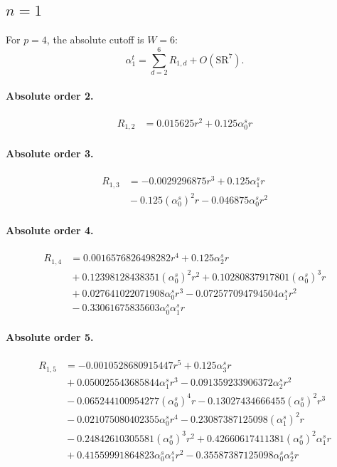 \documentclass[10pt]{article}
\begin{document}
\subsection{$n=1$}
For $p=4$, the absolute cutoff is $W=6$:
\[\alpha_{1}^t=\sum_{d=2}^{6}R_{1,d}+O(\mathrm{SR}^{7}).\]
\paragraph{Absolute order 2.}
\begin{align*}
R_{1,2} &= 0.015625 r^{2} + 0.125 \alpha_{0}^s r
\end{align*}

\paragraph{Absolute order 3.}
\begin{align*}
R_{1,3} &=  - 0.0029296875 r^{3} + 0.125 \alpha_{1}^s r \\
&{}  - 0.125 \left(\alpha_{0}^s\right)^{2} r - 0.046875 \alpha_{0}^s r^{2}
\end{align*}

\paragraph{Absolute order 4.}
\begin{align*}
R_{1,4} &= 0.0016576826498282 r^{4} + 0.125 \alpha_{2}^s r \\
&{}  + 0.12398128438351 \left(\alpha_{0}^s\right)^{2} r^{2} + 0.10280837917801 \left(\alpha_{0}^s\right)^{3} r \\
&{}  + 0.027641022071908 \alpha_{0}^s r^{3} - 0.072577094794504 \alpha_{1}^s r^{2} \\
&{}  - 0.33061675835603 \alpha_{0}^s \alpha_{1}^s r
\end{align*}

\paragraph{Absolute order 5.}
\begin{align*}
R_{1,5} &=  - 0.0010528680915447 r^{5} + 0.125 \alpha_{3}^s r \\
&{}  + 0.050025543685844 \alpha_{1}^s r^{3} - 0.091359233906372 \alpha_{2}^s r^{2} \\
&{}  - 0.065244100954277 \left(\alpha_{0}^s\right)^{4} r - 0.13027434666455 \left(\alpha_{0}^s\right)^{2} r^{3} \\
&{}  - 0.021075080402355 \alpha_{0}^s r^{4} - 0.23087387125098 \left(\alpha_{1}^s\right)^{2} r \\
&{}  - 0.24842610305581 \left(\alpha_{0}^s\right)^{3} r^{2} + 0.42660617411381 \left(\alpha_{0}^s\right)^{2} \alpha_{1}^s r \\
&{}  + 0.41559991864823 \alpha_{0}^s \alpha_{1}^s r^{2} - 0.35587387125098 \alpha_{0}^s \alpha_{2}^s r
\end{align*}
\end{document}
